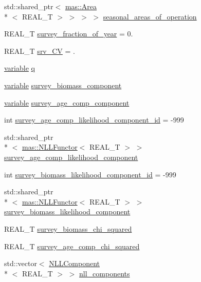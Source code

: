 \begin{DoxyCompactItemize}
std\-::shared\-\_\-ptr$<$ \hyperlink{structmas_1_1_area}{mas\-::\-Area}\\*
$<$ R\-E\-A\-L\-\_\-\-T $>$ $>$ $>$ $>$ \hyperlink{structmas_1_1_survey_a6ecd9fe4f0b4d75b3801e6f74ca75029}{seasonal\-\_\-areas\-\_\-of\-\_\-operation}
\item 
R\-E\-A\-L\-\_\-\-T \hyperlink{structmas_1_1_survey_a60c73865d0f6db4aa33cfd314b77882e}{survey\-\_\-fraction\-\_\-of\-\_\-year} = 0.
\item 
R\-E\-A\-L\-\_\-\-T \hyperlink{structmas_1_1_survey_aad907f4e8413369d6f747f575dca2c91}{srv\-\_\-\-C\-V} = .
\item 
\hyperlink{structmas_1_1_survey_ae91896013e1a3403f7e3d79b1f845966}{variable} \hyperlink{structmas_1_1_survey_a6c5894f588689dc14a54b218da5f6663}{q}
\item 
\hyperlink{structmas_1_1_survey_ae91896013e1a3403f7e3d79b1f845966}{variable} \hyperlink{structmas_1_1_survey_ad2cbd5ec4cb7f54ee7312fd1dece26c4}{survey\-\_\-biomass\-\_\-component}
\item 
\hyperlink{structmas_1_1_survey_ae91896013e1a3403f7e3d79b1f845966}{variable} \hyperlink{structmas_1_1_survey_afa960c2c4912f01084664b99fd9bf736}{survey\-\_\-age\-\_\-comp\-\_\-component}
\item 
int \hyperlink{structmas_1_1_survey_ab091939f1b686d7dcbaf00ac9a2b507e}{survey\-\_\-age\-\_\-comp\-\_\-likelihood\-\_\-component\-\_\-id} = -\/999
\item 
std\-::shared\-\_\-ptr\\*
$<$ \hyperlink{structmas_1_1_n_l_l_functor}{mas\-::\-N\-L\-L\-Functor}$<$ R\-E\-A\-L\-\_\-\-T $>$ $>$ \hyperlink{structmas_1_1_survey_a913143ad9c3da583b3cad6f1a1ab109c}{survey\-\_\-age\-\_\-comp\-\_\-likelihood\-\_\-component}
\item 
int \hyperlink{structmas_1_1_survey_a4bb22fe02896841ef41d76172e0a8f91}{survey\-\_\-biomass\-\_\-likelihood\-\_\-component\-\_\-id} = -\/999
\item 
std\-::shared\-\_\-ptr\\*
$<$ \hyperlink{structmas_1_1_n_l_l_functor}{mas\-::\-N\-L\-L\-Functor}$<$ R\-E\-A\-L\-\_\-\-T $>$ $>$ \hyperlink{structmas_1_1_survey_abee83156dc5c12a911adc3e107931d3d}{survey\-\_\-biomass\-\_\-likelihood\-\_\-component}
\item 
R\-E\-A\-L\-\_\-\-T \hyperlink{structmas_1_1_survey_a6cfcc6ed9b540be83a61cb44e7285d79}{survey\-\_\-biomass\-\_\-chi\-\_\-squared}
\item 
R\-E\-A\-L\-\_\-\-T \hyperlink{structmas_1_1_survey_acd94359a531d576cfbbe7d5a1faab9f5}{survey\-\_\-age\-\_\-comp\-\_\-chi\-\_\-squared}
\item 
std\-::vector$<$ \hyperlink{structmas_1_1_n_l_l_component}{N\-L\-L\-Component}\\*
$<$ R\-E\-A\-L\-\_\-\-T $>$ $>$ \hyperlink{structmas_1_1_survey_a329e35f53bdb96c93709981bba9cf5b6}{nll\-\_\-components}
\end{DoxyCompactItemize}


